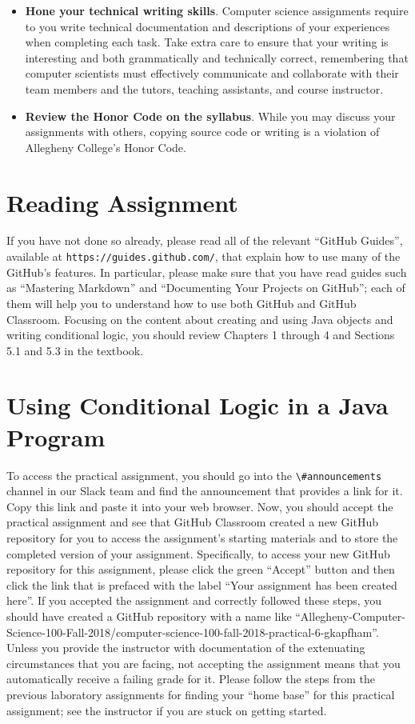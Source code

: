 \documentclass[11pt]{article}
\newcommand{\url}[1]{\lstinline{#1}}
\newcommand{\channel}[1]{\lstinline{#1}}
\begin{document}
\begin{itemize}
\item {\bf Hone your technical writing skills}. Computer science assignments
  require to you write technical documentation and descriptions of your
  experiences when completing each task. Take extra care to ensure that your
  writing is interesting and both grammatically and technically correct,
  remembering that computer scientists must effectively communicate and
  collaborate with their team members and the tutors, teaching assistants, and
  course instructor.

\item {\bf Review the Honor Code on the syllabus}. While you may discuss your
  assignments with others, copying source code or writing is a violation of
  Allegheny College's Honor Code.

\end{itemize}

\section*{Reading Assignment}

If you have not done so already, please read all of the relevant ``GitHub
Guides'', available at \url{https://guides.github.com/}, that explain how to use
many of the GitHub's features. In particular, please make sure that you have
read guides such as ``Mastering Markdown'' and ``Documenting Your Projects on
GitHub''; each of them will help you to understand how to use both GitHub and
GitHub Classroom. Focusing on the content about creating and using Java objects
and writing conditional logic, you should review Chapters 1 through 4 and
Sections 5.1 and 5.3 in the textbook.

\section*{Using Conditional Logic in a Java Program}

To access the practical assignment, you should go into the
\channel{\#announcements} channel in our Slack team and find the announcement
that provides a link for it. Copy this link and paste it into your web browser.
Now, you should accept the practical assignment and see that GitHub Classroom
created a new GitHub repository for you to access the assignment's starting
materials and to store the completed version of your assignment. Specifically,
to access your new GitHub repository for this assignment, please click the green
``Accept'' button and then click the link that is prefaced with the label ``Your
assignment has been created here''. If you accepted the assignment and correctly
followed these steps, you should have created a GitHub repository with a name
like
``Allegheny-Computer-Science-100-Fall-2018/computer-science-100-fall-2018-practical-6-gkapfham''.
Unless you provide the instructor with documentation of the extenuating
circumstances that you are facing, not accepting the assignment means that you
automatically receive a failing grade for it. Please follow the steps from the
previous laboratory assignments for finding your ``home base'' for this
practical assignment; see the instructor if you are stuck on getting started.
\end{document}
